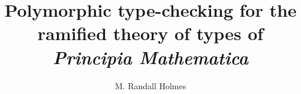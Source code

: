 \documentclass{article}
\title{Polymorphic type-checking for the ramified theory of types of {\em Principia Mathematica\/}}
\author{M. Randall Holmes}
\begin{document}
 

\def\citaat#1#2{\begin{quote} ``#2'' \begin{flushright}(#1)
		\end{flushright}\end{quote}}

\newtheorem{stell}{Theorem}
\newtheorem{lem}[stell]{Lemma}
\newtheorem{Defin}[stell]{Definition}
\newenvironment{defin}{\begin{Defin} \rm}{\end{Defin}}
\newtheorem{gevolg}[stell]{Corollary}
\newtheorem{vcp}[stell]{Vicious Circle Principle}
\newtheorem{absprin}[stell]{Abstraction Principle}
\newtheorem{Conventie}[stell]{Convention}
\newenvironment{conventie}{\begin{Conventie} \rm}{\end{Conventie}}
\newtheorem{Notatie}[stell]{Notation}
\newenvironment{notatie}{\begin{Notatie} \rm}{\end{Notatie}}
\newtheorem{Voorbeeld}[stell]{Example}
\newenvironment{voorbeeld}{\begin{Voorbeeld} \rm}{\end{Voorbeeld}} 
\newtheorem{axioma}[stell]{Axiom}
\newtheorem{Opm}[stell]{Remark}
\newenvironment{opm}{\begin{Opm} \rm}{\end{Opm}}
\newenvironment{push}{\begin{list}{}{\setlength{\topsep}{0pt}} \item }
	{\end{list}}
\newenvironment{bewijs}{\begin{list}{}{\setlength{\leftmargin}{0pt}
	\setlength{\rightmargin}{0pt}} \item {\sc Proof:}}{\hfill $\boxtimes$\end{list}}

\def\myvec#1{\overset{\rightarrow}{#1}}
\def\Lhaak{\left[}
\def\lhaak{\left(}
\def\lacc{\left\{}
\def\rhaak{\right)}
\def\Rhaak{\right]}
\def\racc{\right\}}
\newcommand{\ij}{i\kern-0.02em j} %
\newcommand{\IJ}{i\kern-0.02em j} %
\def\cx{{\mathbb C}}
\def\r{{\mathbb R}}
\def\q{{\mathbb Q}}
\def\z{{\mathbb Z}}
\def\t{{\mathbb T}}
\def\v{{\mathbb V}}
\def\s{{\mathbb S}}
\def\p{P}
\def\n{{\mathbb N}}
\def\en{\wedge}
\def\of{\vee}
\def\Pijl{\Rightarrow}
\def\pijl{\rightarrow}
\def\terugpijl{\leftarrow}
\def\desda{\leftrightarrow}
\def\Desda{\Leftrightarrow}
\def\niet{\neg}
\def\er{\exists}
\def\al{\forall}
\def\deel{\subseteq}
\def\omvat{\supseteq}
\def\veren{\cup}
\def\Veren{\bigcup}
\def\dveren{\stackrel{.}{\veren}}
\def\Dveren#1#2{\Veren_{{#1}}^{{#2}}}
\def\door{\cap}
\def\Door{\bigcap}
\def\wegg{\setminus}
\def\comp#1{#1^c}
\def\symver{\bigtriangleup}
\def\leeg{\varnothing}
\def\inj{\hookrightarrow}
\def\surj{\rightarrow\!\!\!\!\!\rightarrow}
\def\bij{\hookrightarrow\!\!\!\!\!\rightarrow}
\def\samenst{\circ}
\def\ffi{\varphi}
\def\teta{\vartheta}
\def\epsil{\varepsilon}
\def\disp{\displaystyle}
\end{document}
